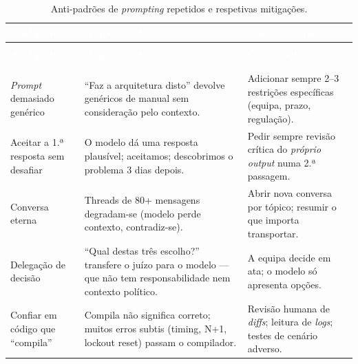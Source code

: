\begin{center}
{\small
{}
\begin{xltabular}{\textwidth}{|>{\raggedright\arraybackslash}p{4cm}|>{\raggedright\arraybackslash}X|>{\raggedright\arraybackslash}X|}
\hline
{}\textcolor{white}{\textbf{Anti-padrão}} & \textcolor{white}{\textbf{O que acontece}} & \textcolor{white}{\textbf{Como evitámos}} \\ \hline
\endfirsthead

 \\
\hline
{}\textcolor{white}{\textbf{Anti-padrão}} & \textcolor{white}{\textbf{O que acontece}} & \textcolor{white}{\textbf{Como evitámos}} \\ \hline
\endhead

\hline {} \\ \hline \endfoot

\hline
\caption{Anti-padrões de \textit{prompting} repetidos e respetivas mitigações.}
\label{tab:anti_padroes} \\
\endlastfoot

\textit{Prompt} demasiado genérico & ``Faz a arquitetura disto'' devolve genéricos de manual sem consideração pelo contexto. & Adicionar sempre 2--3 restrições específicas (equipa, prazo, regulação). \\ \hline

Aceitar a 1.ª resposta sem desafiar & O modelo dá uma resposta plausível; aceitamos; descobrimos o problema 3 dias depois. & Pedir sempre revisão crítica do \textit{próprio output} numa 2.ª passagem. \\ \hline

Conversa eterna & Threads de 80+ mensagens degradam-se (modelo perde contexto, contradiz-se). & Abrir nova conversa por tópico; resumir o que importa transportar. \\ \hline

Delegação de decisão & ``Qual destas três escolho?'' transfere o juízo para o modelo --- que não tem responsabilidade nem contexto político. & A equipa decide em ata; o modelo só apresenta opções. \\ \hline

Confiar em código que ``compila'' & Compila não significa correto; muitos erros subtis (timing, N+1, lockout reset) passam o compilador. & Revisão humana de \textit{diffs}; leitura de \textit{logs}; testes de cenário adverso. \\ \hline

\end{xltabular}
}
\end{center}

